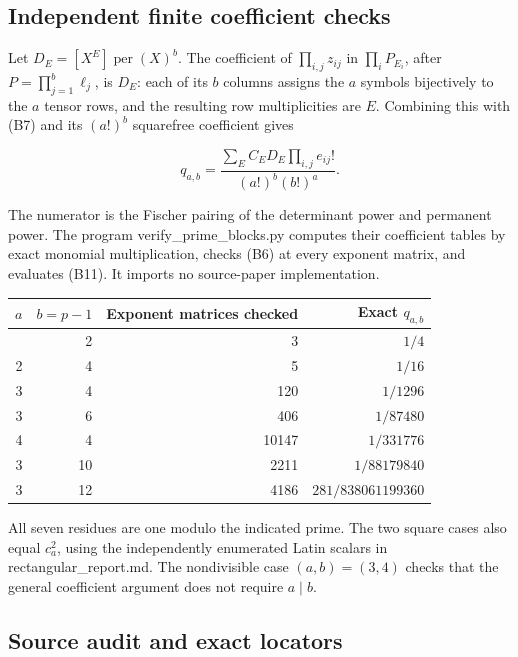 \documentclass[
  10pt,
]{article}
\begin{document}
\subsection{Independent finite coefficient
checks}\label{independent-finite-coefficient-checks}

Let \(D_E=[X^E]\operatorname{per}(X)^b\). The coefficient of
\(\prod_{i,j}z_{ij}\) in \(\prod_iP_{E_i}\), after
\(P=\prod_{j=1}^b\ell_j\), is \(D_E\): each of its \(b\) columns assigns
the \(a\) symbols bijectively to the \(a\) tensor rows, and the
resulting row multiplicities are \(E\). Combining this with (B7) and its
\((a!)^b\) squarefree coefficient gives

\[
 q_{a,b}=
 \frac{\sum_E C_ED_E\prod_{i,j}e_{ij}!}
      {(a!)^b(b!)^a}.
 \tag{B11}
\]

The numerator is the Fischer pairing of the determinant power and
permanent power. The program verify\_prime\_blocks.py computes their
coefficient tables by exact monomial multiplication, checks (B6) at
every exponent matrix, and evaluates (B11). It imports no source-paper
implementation.

\begin{longtable}[]{@{}rrrr@{}}
\toprule\noalign{}
\(a\) & \(b=p-1\) & Exponent matrices checked & Exact \(q_{a,b}\) \\
\midrule\noalign{}
\endhead
\bottomrule\noalign{}
\endlastfoot
2 & 2 & 3 & \(1/4\) \\
2 & 4 & 5 & \(1/16\) \\
3 & 4 & 120 & \(1/1296\) \\
3 & 6 & 406 & \(1/87480\) \\
4 & 4 & 10147 & \(1/331776\) \\
3 & 10 & 2211 & \(1/88179840\) \\
3 & 12 & 4186 & \(281/838061199360\) \\
\end{longtable}

All seven residues are one modulo the indicated prime. The two square
cases also equal \(c_a^2\), using the independently enumerated Latin
scalars in rectangular\_report.md. The nondivisible case \((a,b)=(3,4)\)
checks that the general coefficient argument does not require
\(a\mid b\).

\subsection{Source audit and exact
locators}\label{source-audit-and-exact-locators}
\end{document}
